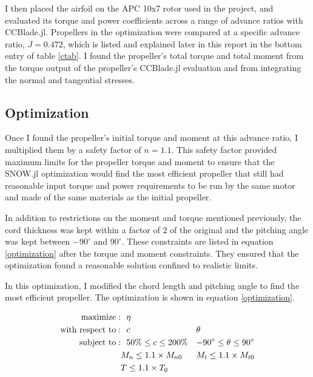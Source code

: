 \documentclass[journal ]{new-aiaa}
\newcounter{ctab}
\begin{document}
I then placed the airfoil on the APC 10x7 rotor used in the project, and evaluated its torque and power coefficients across a range of advance ratios with CCBlade.jl. Propellers in the optimization were compared at a specific advance ratio, $J=0.472$, which is listed and explained later in this report in the bottom entry of table \ref{ctab}. I found the propeller's total torque and total moment from the torque output of the propeller's CCBlade.jl evaluation and from integrating the normal and tangential stresses.

\subsection{Optimization}

Once I found the propeller's initial torque and moment at this advance ratio, I multiplied them by a safety factor of $n=1.1$. This safety factor provided maximum limits for the propeller torque and moment to ensure that the SNOW.jl optimization would find the most efficient propeller that still had reasonable input torque and power requirements to be run by the same motor and made of the same materials as the initial propeller.

In addition to restrictions on the moment and torque mentioned previously, the cord thickness was kept within a factor of 2 of the original and the pitching angle was kept between $-90^{\circ}$ and $90^{\circ}$. These constraints are listed in equation \ref{optimization} after the torque and moment constraints. They ensured that the optimization found a reasonable solution confined to realistic limits.

In this optimization, I modified the chord length and pitching angle to find the most efficient propeller. The optimization is shown in equation \ref{optimization}. 

\begin{equation}
	\begin{aligned}
		\mathrm{maximize:}& ~~ \eta \\
		\mathrm{with~respect~to:}& ~~ c & \multicolumn{1}{l}{$\theta$} \\
		\mathrm{subject~to:}& ~~ 50\% \leq c \leq 200\% & -90^{\circ} \leq \theta \leq 90^{\circ} \\
		& M_{n} \leq 1.1 \times M_{n0} & M_{t} \leq 1.1 \times M_{t0} \\
		& T \leq 1.1 \times T_{0} \\
	\end{aligned}
	\label{optimization}
\end{equation}
\end{document}
